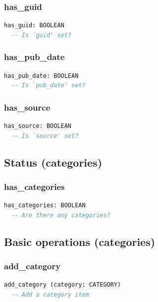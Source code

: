 \subsubsection{has\_guid}

\begin{lstlisting}[language=Eiffel]
has_guid: BOOLEAN
  -- Is `guid' set?
\end{lstlisting}

\subsubsection{has\_pub\_date}

\begin{lstlisting}[language=Eiffel]
has_pub_date: BOOLEAN
  -- Is `pub_date' set?
\end{lstlisting}

\subsubsection{has\_source}

\begin{lstlisting}[language=Eiffel]
has_source: BOOLEAN
  -- Is `source' set?
\end{lstlisting}

\subsection{Status (categories)}
\label{sec:item-status-categories}

\subsubsection{has\_categories}

\begin{lstlisting}[language=Eiffel]
has_categories: BOOLEAN
  -- Are there any categories?
\end{lstlisting}

\subsection{Basic operations (categories)}
\label{sec:item-basic-operations-categories}

\subsubsection{add\_category}

\begin{lstlisting}[language=Eiffel]
add_category (category: CATEGORY)
  -- Add a category item
\end{lstlisting}

